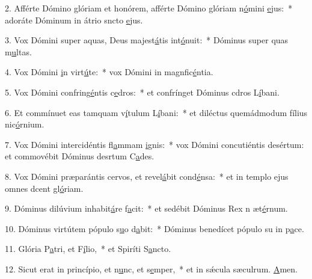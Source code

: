 2. Afférte Dómino glóriam et honórem, afférte Dómino glóriam n\uline{ó}mini \uline{e}jus:~* adoráte Dóminum in átrio sncto \uline{e}jus.\par 
3. Vox Dómini super aquas, Deus majest\uline{á}tis int\uline{ó}nuit:~* Dóminus super quas m\uline{u}ltas.\par 
4. Vox Dómini \uline{i}n virt\uline{ú}te:~* vox Dómini in magnfic\uline{é}ntia.\par 
5. Vox Dómini confring\uline{é}ntis c\uline{e}dros:~* et confrínget Dóminus cdros L\uline{í}bani.\par 
6. Et commínuet eas tamquam v\uline{í}tulum L\uline{í}bani:~* et diléctus quemádmodum fílius nic\uline{ó}rnium.\par 
7. Vox Dómini intercidéntis fl\uline{a}mmam \uline{i}gnis:~* vox Dómini concutiéntis desértum: et commovébit Dóminus desrtum C\uline{a}des.\par 
8. Vox Dómini præparántis cervos, et revel\uline{á}bit cond\uline{é}nsa:~* et in templo ejus omnes dcent gl\uline{ó}riam.\par 
9. Dóminus dilúvium inhabit\uline{á}re f\uline{a}cit:~* et sedébit Dóminus Rex n æt\uline{é}rnum.\par 
10. Dóminus virtútem pópulo s\uline{u}o d\uline{a}bit:~* Dóminus benedícet pópulo su in p\uline{a}ce.\par 
11. Glória P\uline{a}tri, et F\uline{í}lio,~* et Spiríti S\uline{a}ncto.\par 
12. Sicut erat in princípio, et n\uline{u}nc, et s\uline{e}mper,~* et in sǽcula sæculrum. \uline{A}men.\par 
